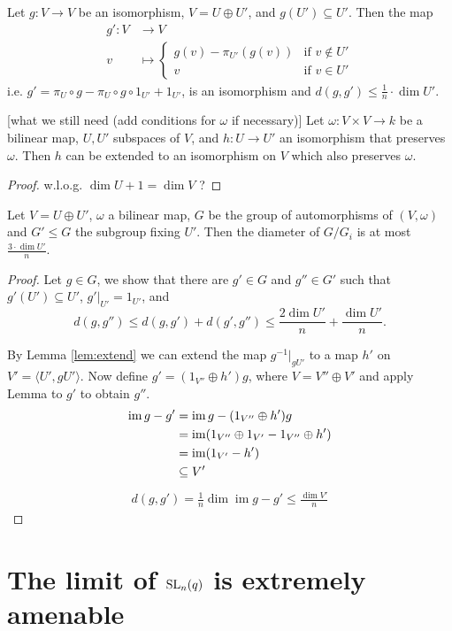 \begin{lemma}
Let $g\colon V\to V$ be an isomorphism, $V=U\oplus U'$, and $g(U')\subseteq U'$. %
Then the map 
\begin{align*}
g'\colon V&\to V\\
v&\mapsto
\begin{cases}
g(v)-\pi_{U'}(g(v)) &\text{if }v\notin U'\\
v &\text{if }v\in U'
\end{cases}
\end{align*}
i.e. $g'=\pi_U\circ g-\pi_U\circ g \circ1_{U'} +1_{U'}$, is an isomorphism and $d(g,g')\leq \frac{1}{n}\cdot\dim U'$.
\end{lemma}


\begin{lemma}\label{lem:extend}[what we still need (add conditions for $\omega$ if necessary)]
Let $\omega\colon V\times V\to k$ be a bilinear map, $U,U'$ subspaces of $V$, and $h\colon U\to U'$ an isomorphism that preserves $\omega$. Then $h$ can be extended to an isomorphism on $V$ which also preserves $\omega$.
\end{lemma}
\begin{proof}
w.l.o.g. $\dim U+1= \dim V$ ?
\end{proof}


\begin{lemma}
Let $V=U\oplus U'$, $\omega$ a bilinear map, $G$ be the group of automorphisms of $(V,\omega)$ and $G'\leq G$ the subgroup fixing $U'$. Then the diameter of $G/G_i$ is at most $\frac{3\cdot\dim U'}{n}$.
\end{lemma}
\begin{proof}
Let $g\in G$, we show that there are $g'\in G$ and $g''\in G'$ such that $g'(U')\subseteq U'$, $g'|_{U'}=1_{U'}$, and
\[d(g,g'')\leq d(g,g')+d(g',g'')\leq \frac{2\dim U'}{n}+\frac{\dim U'}{n}.\]

By Lemma \ref{lem:extend} we can extend the map $g^{-1}|_{gU'}$ to a map $h'$ on $V'=\langle U',gU' \rangle$. Now define $g'=(1_{V''}\oplus h')g$, where $V=V''\oplus V'$ and apply Lemma to $g'$ to obtain $g''$.
\begin{align*}
\operatorname{im} g-g'&= \operatorname{im} g-(1_{V''}\oplus h')g\\
&=\operatorname{im} (1_{V''}\oplus 1_{V'}-1_{V''}\oplus h')\\
&=\operatorname{im} (1_{V'}-h')\\
&\subseteq V'	
\end{align*}
\begin{align*}
d(g,g')=\frac{1}{n}\dim \operatorname{im} g-g'\leq \frac{\dim V'}{n}
\end{align*}
\end{proof}

\section{The limit of $\operatorname{SL}_n(q)$ is extremely amenable}